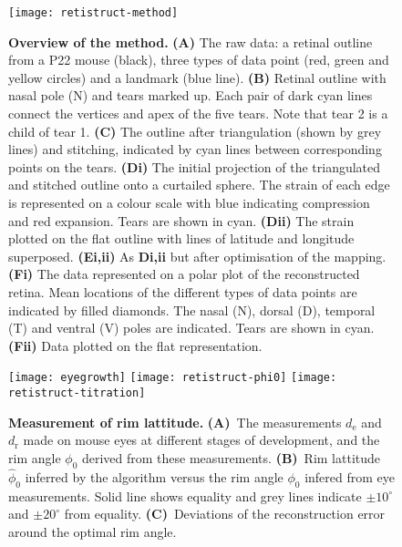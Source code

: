 \documentclass[10pt]{article}
\begin{document}
\begin{figure}[!ht]
  \texttt{[image: retistruct-method]}

  \caption{\textbf{Overview of the method.} \textbf{(A)} The raw data:
    a retinal outline from a P22 mouse (black), three types of data
    point (red, green and yellow circles) and a landmark (blue
    line). \textbf{(B)} Retinal outline with nasal pole (N) and tears
    marked up. Each pair of dark cyan lines connect the vertices and
    apex of the five tears. Note that tear 2 is a child of tear
    1. \textbf{(C)} The outline after triangulation (shown by grey
    lines) and stitching, indicated by cyan lines between
    corresponding points on the tears.  \textbf{(Di)} The initial
    projection of the triangulated and stitched outline onto a
    curtailed sphere. The strain of each edge is represented on a colour
    scale with blue indicating compression and red expansion. Tears
    are shown in cyan. \textbf{(Dii)} The strain plotted on the flat
    outline with lines of latitude and longitude
    superposed. \textbf{(Ei,ii)} As \textbf{Di,ii} but after
    optimisation of the mapping. \textbf{(Fi)} The data represented on
    a polar plot of the reconstructed retina. Mean locations of the
    different types of data points are indicated by filled
    diamonds. The nasal (N), dorsal (D), temporal (T) and ventral (V)
    poles are indicated. Tears are shown in cyan. \textbf{(Fii)} Data
    plotted on the flat representation.}
  \label{fold-sphere:fig:method}
\end{figure}
\begin{figure}[!ht]
  \centering
  \texttt{[image: eyegrowth]}
  \texttt{[image: retistruct-phi0]}
  \texttt{[image: retistruct-titration]}
  \caption{\textbf{Measurement of rim lattitude.} \textbf{(A)}~The
    measurements $d_\mathrm{e}$ and $d_\mathrm{r}$ made on mouse eyes
    at different stages of development, and the rim angle $\phi_0$
    derived from these measurements. \textbf{(B)}~Rim lattitude
    $\hat{\phi}_0$ inferred by the algorithm versus the rim angle
    $\phi_0$ infered from eye measurements. Solid line shows equality
    and grey lines indicate $\pm10^\circ$ and $\pm20^\circ$ from
    equality. \textbf{(C)}~Deviations of the reconstruction error
    around the optimal rim angle.}
  \label{retistruct_plos:fig:eyegrowth}
\end{figure}
\end{document}
